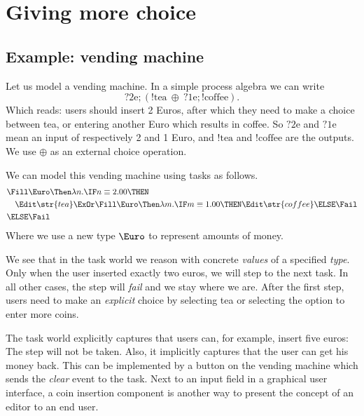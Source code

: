 
\section{Giving more choice}

\subsection{Example: vending machine}

Let us model a vending machine.
In a simple process algebra we can write
\begin{equation*}
  ?\text{2e}; (!\text{tea}\ \oplus\ ?\text{1e}; !\text{coffee}).
\end{equation*}
Which reads:
users should insert 2 Euros,
after which they need to make a choice between tea,
or entering another Euro which results in coffee.
So $?\text{2e}$ and $?\text{1e}$ mean an input of respectively 2 and 1 Euro,
and $!\text{tea}$ and $!\text{coffee}$ are the outputs.
We use $\oplus$ as an external choice operation.

We can model this vending machine using tasks as follows.
\begin{align*}
  & \Fill \Euro \Then \lambda n.
  \IF n \equiv 2.00 \THEN \\
  &   \quad \Edit \str{tea}
    \ExOr
      \Fill \Euro \Then \lambda m.
      \IF m \equiv 1.00 \THEN
        \Edit \str{coffee}
      \ELSE
        \Fail \\
  & \ELSE \Fail
\end{align*}
Where we use a new type $\Euro$ to represent amounts of money.

We see that in the task world we reason with concrete \emph{values} of a specified \emph{type}.
Only when the user inserted exactly two euros,
we will step to the next task.
In all other cases,
the step will \emph{fail} and we stay where we are.
After the first step,
users need to make an \emph{explicit} choice by selecting tea or selecting the option to enter more coins.

The task world explicitly captures that users can, for example, insert five euros:
The step will not be taken.
Also, it implicitly captures that the user can get his money back.
This can be implemented by a button on the vending machine which sends the \emph{clear} event to the task.
Next to an input field in a graphical user interface,
a coin insertion component is another way to present the concept of an editor to an end user.


